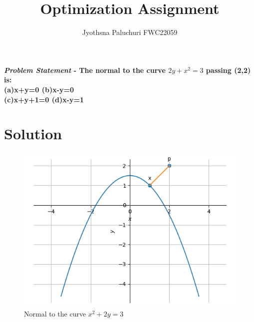 \documentclass[journal,10pt,twocolumn]{article}
\title{\textbf{Optimization Assignment}}
\author{Jyothsna Paluchuri \hspace{9cm} FWC22059}
\begin{document}
\maketitle
\paragraph{\textit{Problem Statement} - The normal to the curve \(2y+x^2=3\) passing (2,2) is:\\
(a)x+y=0  \hspace{2cm} (b)x-y=0\\ 
(c)x+y+1=0 \hspace{2cm}  (d)x-y=1\\}

\section*{\large Solution}

\begin{figure}[H]
\centering
\includegraphics[width=1\columnwidth]{opt.png}
\caption{Normal to the curve $x^2+2y=3$}
\end{figure}
\end{document}

